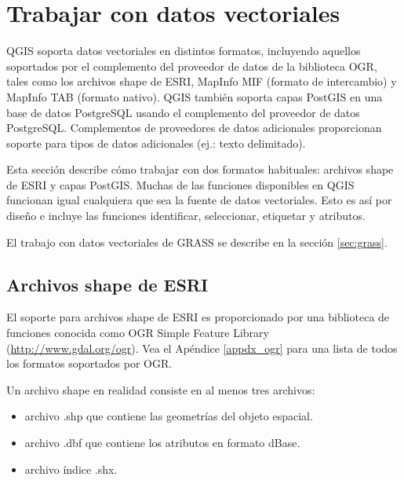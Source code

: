 
\section{Trabajar con datos vectoriales}\label{label_workingvector}

QGIS soporta datos vectoriales en distintos formatos, incluyendo aquellos soportados por el complemento del proveedor de datos de la biblioteca OGR, tales como los archivos shape de ESRI,
MapInfo MIF (formato de intercambio)
y MapInfo TAB (formato nativo).
QGIS también soporta capas PostGIS
en una base de datos PostgreSQL usando el complemento del proveedor de datos PostgreSQL. Complementos de proveedores de datos adicionales proporcionan soporte para tipos de datos adicionales (ej.: texto delimitado).

Esta sección describe cómo trabajar con dos formatos habituales: archivos shape de ESRI y capas PostGIS. Muchas de las funciones disponibles en QGIS funcionan igual cualquiera que sea la fuente de datos vectoriales. Esto es así por diseño e incluye las funciones identificar, seleccionar, etiquetar y atributos.

El trabajo con datos vectoriales de GRASS se describe en la sección \ref{sec:grass}.

\subsection{Archivos shape de ESRI}

El soporte para archivos shape de ESRI es proporcionado por una biblioteca de funciones conocida como OGR Simple Feature Library (\url{http://www.gdal.org/ogr}). Vea el Apéndice \ref{appdx_ogr} para una lista de todos los formatos soportados por OGR.

Un archivo shape en realidad consiste en al menos tres archivos:

\begin{itemize}
\item archivo .shp que contiene las geometrías del objeto espacial.
\item archivo .dbf que contiene los atributos en formato dBase.
\item archivo índice .shx.
\end{itemize}

